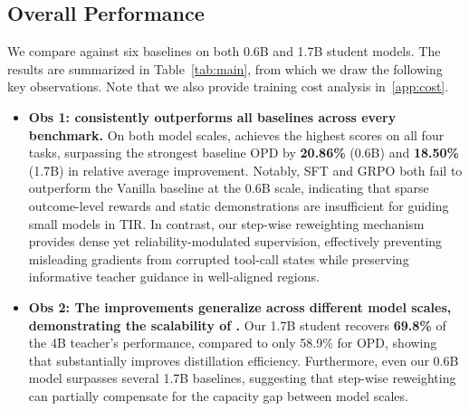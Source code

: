 






\subsection{Overall Performance}

We compare \ourmodel against six baselines on both 0.6B and 1.7B student models. The results are summarized in Table~\ref{tab:main}, from which we draw the following key observations. Note that we also provide training cost analysis in~\cref{app:cost}.

\begin{itemize}[leftmargin=*]

\item \textbf{Obs 1: \ourmodel consistently outperforms all baselines across every benchmark.}
On both model scales, \ourmodel achieves the highest scores on all four tasks, surpassing the strongest baseline OPD by \textbf{20.86\%} (0.6B) and \textbf{18.50\%} (1.7B) in relative average improvement. Notably, SFT and GRPO both fail to outperform the Vanilla baseline at the 0.6B scale, indicating that sparse outcome-level rewards and static demonstrations are insufficient for guiding small models in TIR. In contrast, our step-wise reweighting mechanism provides dense yet reliability-modulated supervision, effectively preventing misleading gradients from corrupted tool-call states while preserving informative teacher guidance in well-aligned regions.

\item \textbf{Obs 2: The improvements generalize across different model scales, demonstrating the scalability of \ourmodel.}
Our 1.7B student recovers \textbf{69.8\%} of the 4B teacher's performance, compared to only 58.9\% for OPD, showing that \ourmodel substantially improves distillation efficiency. Furthermore, even our 0.6B model surpasses several 1.7B baselines, suggesting that step-wise reweighting can partially compensate for the capacity gap between model scales. %

\end{itemize}




